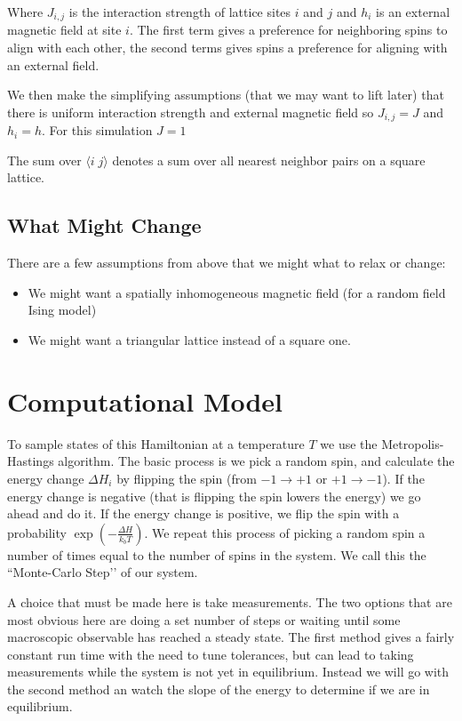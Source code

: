 \documentclass[]{scrartcl}
\begin{document}
	Where $J_{i,j}$ is the interaction strength of lattice sites $i$ and $j$ and $h_i$ is an external magnetic field at site $i$. The first term gives a preference for neighboring spins to align with each other, the second terms gives spins a preference for aligning with an external field.
	
	We then make the simplifying assumptions (that we may want to lift later) that there is uniform interaction strength and external magnetic field so $J_{i,j} = J$ and $h_i = h$. For this simulation $J = 1$
	
	The sum over $\langle i \; j \rangle$ denotes a sum over all nearest neighbor pairs on a square lattice.
	

	
	\subsection{What Might Change}
	There are a few assumptions from above that we might what to relax or change:
	\begin{itemize}
		\item We might want a spatially inhomogeneous magnetic field (for a random field Ising model) 
		\item We might want a triangular lattice instead of a square one.
		
	\end{itemize}
	
	
	\section{Computational Model}
	
	To sample states of this Hamiltonian at a temperature $T$ we use the Metropolis-Hastings algorithm. The basic process is we pick a random spin, and calculate the energy change $\Delta H_i$ by flipping the spin (from $-1 \rightarrow +1$ or $+1 \rightarrow -1$). If the energy change is negative (that is flipping the spin lowers the energy) we go ahead and do it. If the energy change is positive, we flip the spin with a probability $\exp(-\frac{\Delta H}{k_b T})$. We repeat this process of picking a random spin a number of times equal to the number of spins in the system. We call this the ``Monte-Carlo Step’’ of our system. 
	
	A choice that must be made here is take measurements. The two options that are most obvious here are doing a set number of steps or waiting until some macroscopic observable has reached a steady state. The first method gives a fairly constant run time with the need to tune tolerances, but can lead to taking measurements while the system is not yet in equilibrium. Instead we will go with the second method an watch the slope of the energy to determine if we are in equilibrium. 
	
\end{document}
